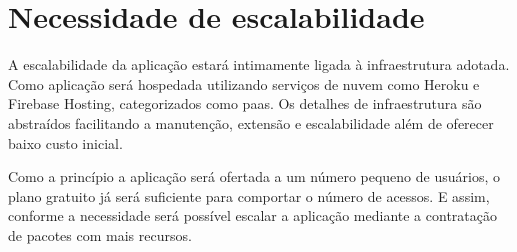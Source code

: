 \section{Necessidade de escalabilidade}
A escalabilidade da aplicação estará intimamente ligada à infraestrutura adotada. Como aplicação será hospedada utilizando serviços de nuvem como Heroku e Firebase Hosting, categorizados como \ac{paas}. Os detalhes de infraestrutura são abstraídos facilitando a manutenção, extensão e escalabilidade além de oferecer baixo custo inicial. 

Como a princípio a aplicação será ofertada a um número pequeno de usuários, o plano  gratuito já será suficiente para comportar o número de acessos. E assim, conforme a necessidade será possível escalar a aplicação mediante a contratação de pacotes com mais recursos.